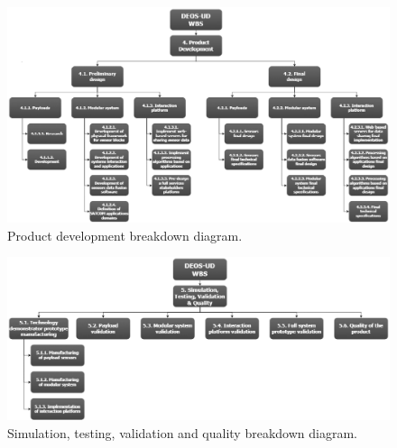 \begin{figure}[H]
	\centering
	\includegraphics[width=\textwidth]{./sections/2.WBS/WBS_Section4}
	\caption[Product development breakdown diagram]{Product development breakdown diagram.}
	\label{fig:WBS_Section4}
\end{figure}

\begin{figure}[H]
	\centering
	\includegraphics[width=\textwidth]{./sections/2.WBS/WBS_Section5}
	\caption[Simulation, testing, validation and quality breakdown diagram]{Simulation, testing, validation and quality breakdown diagram.}
	\label{fig:WBS_Section5}
\end{figure}


